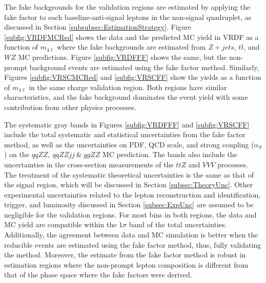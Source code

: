 The fake backgrounds for the validation regions are estimated by applying the fake factor to each baseline-anti-signal leptons in the non-signal quadruplet, as discussed in Section \ref{subsubsec:EstimationStrategy}. Figure \ref{subfig:VRDFMCRed} shows the data and the predicted MC yield in VRDF as a function of $m_{4\ell}$ where the fake backgrounds are estimated from $Z+jets$, $t\bar{t}$, and $WZ$ MC predictions. Figure \ref{subfig:VRDFFF} shows the same, but the non-prompt background events are estimated using the fake factor method. Similarly, Figures \ref{subfig:VRSCMCRed} and \ref{subfig:VRSCFF} show the yields as a function of $m_{4\ell}$ in the same charge validation region. Both regions have similar characteristics, and the fake background dominates the event yield with some contribution from other physics processes.

The systematic gray bands in Figures \ref{subfig:VRDFFF} and \ref{subfig:VRSCFF} include the total systematic and statistical uncertainties from the fake factor method, as well as the uncertainties on PDF, QCD scale, and strong coupling ($\alpha_{S}$) on the $qqZZ,~qqZZjj~\&~ggZZ$ MC prediction. The bands also include the uncertainties in the cross-section measurements of the $ttZ$ and $VVV$ processes. The treatment of the systematic theoretical uncertainties is the same as that of the signal region, which will be discussed in Section \ref{subsec:TheoryUnc}. Other experimental uncertainties related to the lepton reconstruction and identification, trigger, and luminosity discussed in Section \ref{subsec:ExpUnc} are assumed to be negligible for the validation regions. For most bins in both regions, the data and MC yield are compatible within the $1\sigma$ band of the total uncertainties. Additionally, the agreement between data and MC simulation is better when the reducible events are estimated using the fake factor method, thus, fully validating the method. Moreover, the estimate from the fake factor method is robust in estimation regions where the non-prompt lepton composition is different from that of the phase space where the fake factors were derived.

